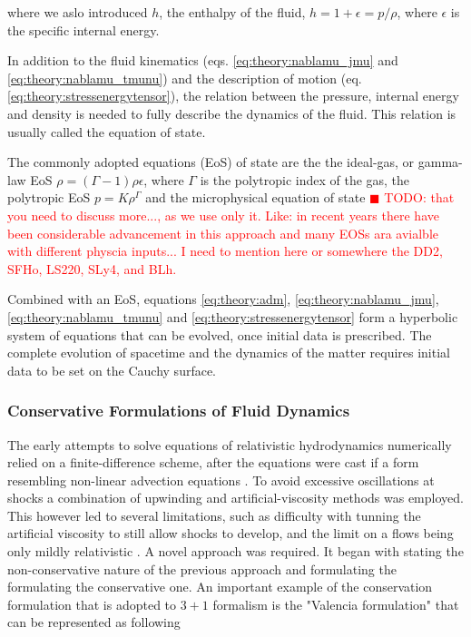 \documentclass[11pt,a4paper,headinclude=true,DIV=14,BCOR=8mm,chapterprefix,listof=totoc,twoside,openright,abstracton]{scrbook}
\newcommand{\todo}[1]{\textcolor{red}{$\blacksquare$ TODO: #1}}
\begin{document}
where we aslo introduced $h$, the enthalpy of the fluid, $h = 1 + \epsilon = p/\rho$, where $\epsilon$ is the specific internal energy. 

In addition to the fluid kinematics (eqs. \ref{eq:theory:nablamu_jmu} and \ref{eq:theory:nablamu_tmunu}) and the description of motion (eq. \ref{eq:theory:stressenergytensor}), the relation between the pressure, internal energy and density is needed to fully describe the dynamics of the fluid. This relation is usually called the equation of state. 

The commonly adopted equations (EoS) of state are the the ideal-gas, or gamma-law EoS $\rho = (\Gamma-1)\rho\epsilon$, where $\Gamma$ is the polytropic index of the gas, the polytropic EoS $p = K\rho^{\Gamma}$ and the microphysical equation of state \todo{that you need to discuss more..., as we use only it. Like: in recent years there have been considerable advancement in this approach and many EOSs ara avialble with different physcia inputs... I need to mention here or somewhere the DD2, SFHo, LS220, SLy4, and BLh.}

Combined with an EoS, equations \ref{eq:theory:adm}, \ref{eq:theory:nablamu_jmu}, \ref{eq:theory:nablamu_tmunu} and \ref{eq:theory:stressenergytensor} form a hyperbolic
system of equations that can be evolved, once initial data is prescribed. The complete evolution of spacetime and the dynamics of the matter requires initial data to be set on the Cauchy surface.


\subsubsection{Conservative Formulations of Fluid Dynamics}

The early attempts to solve equations of relativistic hydrodynamics numerically relied on a finite-difference scheme, after the equations were cast if a form resembling non-linear advection equations \cite{May:1966,Wilson:1972}. To avoid excessive oscillations at shocks a combination of upwinding and artificial-viscosity methods was employed. This however led to several limitations, such as difficulty with tunning the artificial viscosity to still allow shocks to develop, and the limit on a flows being only mildly relativistic \cite{Font:2008fka}. A novel approach was required. It began with stating the non-conservative nature of the previous approach and formulating the formulating the conservative one. An important example of the conservation formulation that is adopted to $3 + 1$ formalism is the "Valencia formulation" \cite{Banyuls:1997} that can be represented as following
\end{document}
